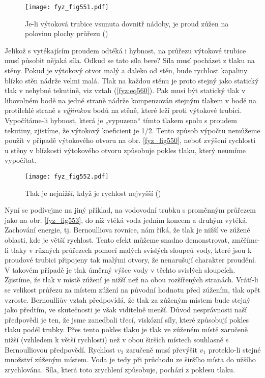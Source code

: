 {    \begin{figure}[ht!] %
      \centering
      \texttt{[image: fyz\_fig551.pdf]}
      \caption{Je-li výtoková trubice vsunuta dovnitř nádoby, je proud zúžen na polovinu plochy 
               průřezu
               (\cite[s.~750]{Feynman02})}
      \label{fyz_fig551}
    \end{figure}
    
    Jelikož s vytékajícím proudem odtéká i hybnost, na průřezu výtokové trubice musí působit nějaká 
    síla. Odkud se tato síla bere? Síla musí pocházet z tlaku na stěny. Pokud je výtokový otvor 
    malý a daleko od stěn, bude rychlost kapaliny blízko stěn nádrže velmi malá. Tlak na každou 
    stěnu je proto stejný jako statický tlak v nehybné tekutině, viz vztah (\ref{fyz:eq560}). Pak 
    musí být statický tlak v libovolném bodě na jedné straně nádrže kompenzován stejným tlakem v 
    bodě na protilehlé straně s \emph{výjimkou} bodů na stěně, které leží proti výtokové trubici. 
    Vypočítáme-li hybnost, která je „vypuzena“ tímto tlakem spolu s proudem tekutiny, zjistíme, že 
    výtokový koeficient je \num{1/2}. Tento způsob výpočtu nemůžeme použít v případě výtokového 
    otvoru na obr. \ref{fyz_fig550}, neboť zvýšení rychlosti u stěny v blízkosti výtokového otvoru 
    způsobuje pokles tlaku, který neumíme vypočítat.

    \begin{figure}[ht!] %
      \centering
      \texttt{[image: fyz\_fig552.pdf]}
      \caption{Tlak je nejnižší, když je rychlost nejvyšší
               (\cite[s.~751]{Feynman02})}
      \label{fyz_fig552}
    \end{figure}
    
    Nyní se podívejme na jiný příklad, na vodovodní trubku s proměnným průřezem jako na obr. 
    \ref{fyz_fig553}, do níž vtéká voda jedním koncem a druhým vytéká. Zachování energie, tj. 
    Bernoulliova rovnice, nám říká, že tlak je nižší ve zúžené oblasti, kde je větší rychlost. 
    Tento efekt můžeme snadno demonstrovat, změříme-li tlaky v různých průřezech pomocí malých 
    svislých sloupců vody, které jsou k proudové trubici připojeny tak malými otvory, že nenarušují 
    charakter proudění. V takovém případě je tlak úměrný výšce vody v těchto svislých sloupcích. 
    Zjistíme, že tlak v místě zúžení je nižší než na obou rozšířených stranách. Vrátí-li se 
    velikost průřezu za místem zúžení na původní hodnotu před zúžením, tlak opět vzroste. 
    Bernoulliův vztah předpovídá, že tlak za zúženým místem bude stejný jako předtím, ve 
    skutečnosti je však viditelně menší. Důvod nesprávnosti naší předpovědi je ten, že jsme 
    zanedbali třecí, viskózní síly, které způsobují pokles tlaku podél trubky. Přes tento pokles 
    tlaku je tlak ve zúženém místě zaručeně nižší (vzhledem k větší rychlosti) než v obou širších 
    místech souhlasně s Bernoulliovou předpovědí. Rychlost \(v_2\) zaručeně musí převýšit \(v_1\) 
    proteklo-li stejné množství zúženým místem. Voda je tedy při průchodu ze širšího místa do 
    užšího zrychlována. Síla, která toto zrychlení způsobuje, pochází z poklesu tlaku.
    
}
